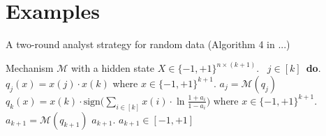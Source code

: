
\section{Examples}


\begin{algorithm}
\caption{A two-round analyst strategy for random data (Algorithm 4 in ...)}
\label{alg:BitGOF}
\begin{algorithmic}
\REQUIRE Mechanism $\mathcal{M}$ with a hidden state $X\in \{-1,+1\}^{n\times (k+1)}$.
\ $j\in [k]$\ {\bf do}.  
\STATE {} $q_j(x)=x(j)\cdot x(k)$ where $x\in \{-1,+1\}^{k+1}$.
\STATE {} $a_j=\mathcal{M}(q_j)$ 
\STATE \qquad {}
 $q_{k}(x)= x(k) \cdot \mathrm{sign}\big (\sum_{i\in [k]} x(i) \cdot \ln\frac{1+a_i}{1-a_i} \big )$ where $x\in \{-1,+1\}^{k+1}$.
\STATE{}
 $a_{k+1}=\mathcal{M}(q_{k+1})$
\STATE{}
\RETURN $a_{k+1}$.
\ENSURE $a_{k+1}\in [-1,+1]$
\end{algorithmic}
\end{algorithm}





\newpage


